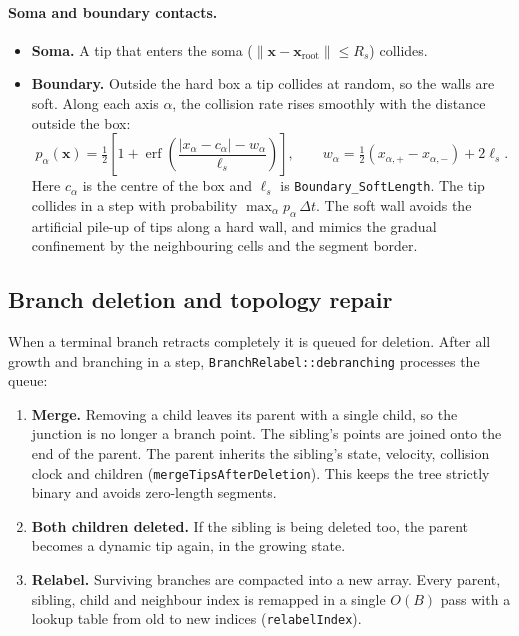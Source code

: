 \documentclass[11pt,a4paper]{article}
\newcommand{\code}[1]{\texttt{#1}}
\newcommand{\vect}[1]{\bm{#1}}
\begin{document}
\paragraph{Soma and boundary contacts.}\label{sec:boundary}
\begin{itemize}
  \item \textbf{Soma.} A tip that enters the soma ($\lVert\vect x-\vect x_\text{root}\rVert\le R_s$) collides.
  \item \textbf{Boundary.} Outside the hard box a tip collides at random, so the walls are soft. Along each axis $\alpha$, the collision rate rises smoothly with the distance outside the box:
  \begin{equation}
    p_\alpha(\vect x)=\tfrac12\left[1+\operatorname{erf}\!\left(\frac{|x_\alpha-c_\alpha|-w_\alpha}{\ell_s}\right)\right],\qquad
    w_\alpha=\tfrac12(x_{\alpha,+}-x_{\alpha,-})+2\ell_s .
  \end{equation}
  Here $c_\alpha$ is the centre of the box and $\ell_s$ is \code{Boundary\_SoftLength}. The tip collides in a step with probability $\max_\alpha p_\alpha\,\Delta t$. The soft wall avoids the artificial pile-up of tips along a hard wall, and mimics the gradual confinement by the neighbouring cells and the segment border.
\end{itemize}

\FloatBarrier
\subsection{Branch deletion and topology repair}\label{sec:topology}
When a terminal branch retracts completely it is queued for deletion. After all growth and branching in a step, \code{BranchRelabel::debranching} processes the queue:
\begin{enumerate}
  \item \textbf{Merge.} Removing a child leaves its parent with a single child, so the junction is no longer a branch point. The sibling's points are joined onto the end of the parent. The parent inherits the sibling's state, velocity, collision clock and children (\code{mergeTipsAfterDeletion}). This keeps the tree strictly binary and avoids zero-length segments.
  \item \textbf{Both children deleted.} If the sibling is being deleted too, the parent becomes a dynamic tip again, in the growing state.
  \item \textbf{Relabel.} Surviving branches are compacted into a new array. Every parent, sibling, child and neighbour index is remapped in a single $O(B)$ pass with a lookup table from old to new indices (\code{relabelIndex}).
\end{enumerate}
\end{document}
